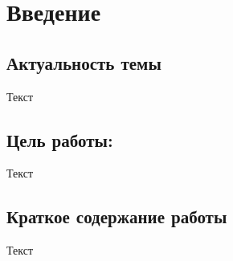 \chapter*{Введение}

\section*{Актуальность  темы}

Текст

\section*{Цель работы:}
Текст

\section*{Краткое содержание работы}
Текст




